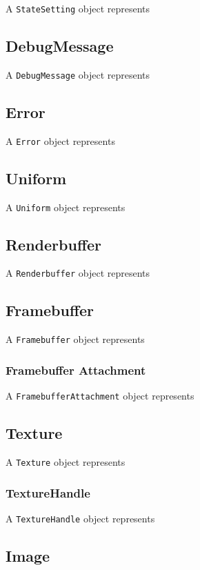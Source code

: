 \documentclass{article}
\begin{document}
A \verb|StateSetting| object represents 

\subsection{DebugMessage}

A \verb|DebugMessage| object represents 

\subsection{Error}

A \verb|Error| object represents 

\subsection{Uniform}

A \verb|Uniform| object represents 

\subsection{Renderbuffer}

A \verb|Renderbuffer| object represents 

\subsection{Framebuffer}

A \verb|Framebuffer| object represents 

\subsubsection{Framebuffer Attachment}

A \verb|FramebufferAttachment| object represents 

\subsection{Texture}

A \verb|Texture| object represents 

\subsubsection{TextureHandle}

A \verb|TextureHandle| object represents 

\subsection{Image}
\end{document}

